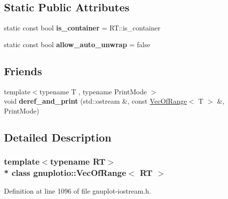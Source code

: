 \subsection*{Static Public Attributes}
\begin{DoxyCompactItemize}
\item 
static const bool {\bfseries is\+\_\+container} = R\+T\+::is\+\_\+container\hypertarget{classgnuplotio_1_1_vec_of_range_a8725d4907d46575dddb7152f1f1d1f66}{}\label{classgnuplotio_1_1_vec_of_range_a8725d4907d46575dddb7152f1f1d1f66}

\item 
static const bool {\bfseries allow\+\_\+auto\+\_\+unwrap} = false\hypertarget{classgnuplotio_1_1_vec_of_range_a19d87e61a7854f9e22d3dd8a94f79500}{}\label{classgnuplotio_1_1_vec_of_range_a19d87e61a7854f9e22d3dd8a94f79500}

\end{DoxyCompactItemize}
\subsection*{Friends}
\begin{DoxyCompactItemize}
\item 
{\footnotesize template$<$typename T , typename Print\+Mode $>$ }\\void {\bfseries deref\+\_\+and\+\_\+print} (std\+::ostream \&, const \hyperlink{classgnuplotio_1_1_vec_of_range}{Vec\+Of\+Range}$<$ T $>$ \&, Print\+Mode)\hypertarget{classgnuplotio_1_1_vec_of_range_adafbfb0122b8e499d1af9c246f4ac288}{}\label{classgnuplotio_1_1_vec_of_range_adafbfb0122b8e499d1af9c246f4ac288}

\end{DoxyCompactItemize}


\subsection{Detailed Description}
\subsubsection*{template$<$typename RT$>$\\*
class gnuplotio\+::\+Vec\+Of\+Range$<$ R\+T $>$}



Definition at line 1096 of file gnuplot-\/iostream.\+h.

